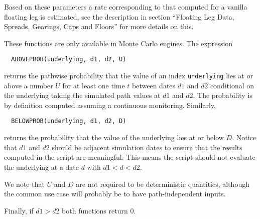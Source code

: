 Based on these parameters a rate corresponding to that computed for a vanilla floating leg is estimated, see the
description in section ``Floating Leg Data, Spreads, Gearings, Caps and Floors'' for more details on this.

\label{function_aboveprob}

These functions are only available in Monte Carlo engines. The expression

\begin{verbatim}
  ABOVEPROB(underlying, d1, d2, U)
\end{verbatim}

returns the pathwise probability that the value of an index \verb+underlying+ lies at or above a number $U$ for at least
one time $t$ between dates $d1$ and $d2$ conditional on the underlying taking the simulated path values at $d1$ and
$d2$. The probability is by definition computed assuming a continuous monitoring. Similarly,

\begin{verbatim}
  BELOWPROB(underlying, d1, d2, D)
\end{verbatim}

returns the probability that the value of the underlying lies at or below $D$. Notice that $d1$ and $d2$ should be
adjacent simulation dates to ensure that the results computed in the script are meaningful. This means the script should
not evaluate the underlying at a date $d$ with $d1 < d < d2$.

We note that $U$ and $D$ are not required to be deterministic quantities, although the common use case will probably be
to have path-independent inputs.

Finally, if $d1>d2$ both functions return $0$.
